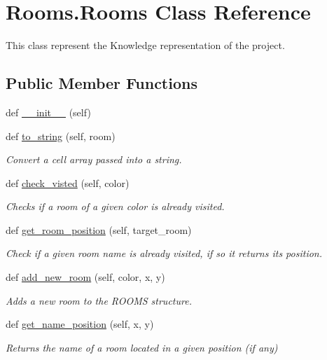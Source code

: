 \hypertarget{classRooms_1_1Rooms}{}\section{Rooms.\+Rooms Class Reference}
\label{classRooms_1_1Rooms}


This class represent the Knowledge representation of the project.  


\subsection*{Public Member Functions}
\begin{DoxyCompactItemize}
\item 
def \hyperlink{classRooms_1_1Rooms_a33491cd5c0e240b173cc7b5b7c004614}{\+\_\+\+\_\+init\+\_\+\+\_\+} (self)
\item 
def \hyperlink{classRooms_1_1Rooms_af4de8388233d61aa35d1567f7a1499c5}{to\+\_\+string} (self, room)
\begin{DoxyCompactList}\small\item\em Convert a cell array passed into a string. \end{DoxyCompactList}\item 
def \hyperlink{classRooms_1_1Rooms_a103b874aa482a4bbc32b7e57e310b557}{check\+\_\+visted} (self, color)
\begin{DoxyCompactList}\small\item\em Checks if a room of a given color is already visited. \end{DoxyCompactList}\item 
def \hyperlink{classRooms_1_1Rooms_a0b0c05bef66a8c33523caa1013abe2e7}{get\+\_\+room\+\_\+position} (self, target\+\_\+room)
\begin{DoxyCompactList}\small\item\em Check if a given room name is already visited, if so it returns its position. \end{DoxyCompactList}\item 
def \hyperlink{classRooms_1_1Rooms_a266a056a0e82793932d3dfbf0c492c29}{add\+\_\+new\+\_\+room} (self, color, x, y)
\begin{DoxyCompactList}\small\item\em Adds a new room to the R\+O\+O\+MS structure. \end{DoxyCompactList}\item 
def \hyperlink{classRooms_1_1Rooms_addc0dcc8b9628a35044e1ffbd67a1e0d}{get\+\_\+name\+\_\+position} (self, x, y)
\begin{DoxyCompactList}\small\item\em Returns the name of a room located in a given position (if any) \end{DoxyCompactList}\item 

\end{DoxyCompactItemize}
